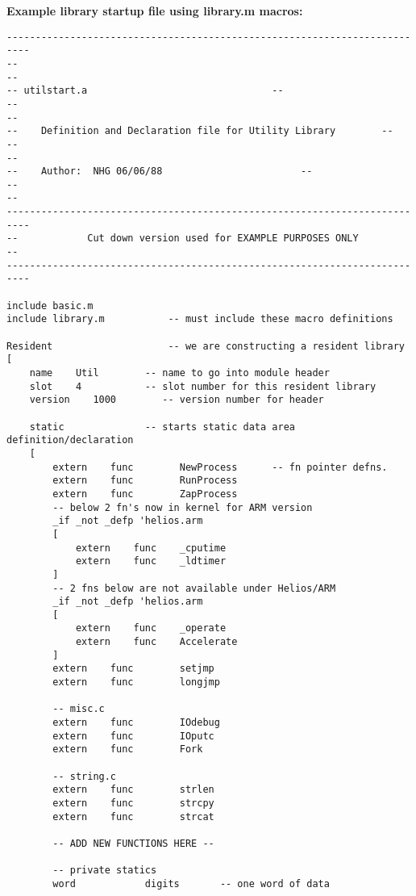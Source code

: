 {\bf Example library startup file using library.m macros:}
\vspace{0.25cm}

\scriptsize
\begin{verbatim}
--------------------------------------------------------------------------
--                                                                      --
-- utilstart.a                                --
--                                                                      --
--    Definition and Declaration file for Utility Library        --
--                                                                      --
--    Author:  NHG 06/06/88                        --
--                                                                      --
--------------------------------------------------------------------------
--            Cut down version used for EXAMPLE PURPOSES ONLY           --
--------------------------------------------------------------------------

include basic.m
include library.m           -- must include these macro definitions

Resident                    -- we are constructing a resident library
[
    name    Util        -- name to go into module header
    slot    4           -- slot number for this resident library
    version    1000        -- version number for header

    static              -- starts static data area definition/declaration
    [
        extern    func        NewProcess      -- fn pointer defns.
        extern    func        RunProcess
        extern    func        ZapProcess
        -- below 2 fn's now in kernel for ARM version
        _if _not _defp 'helios.arm
        [
            extern    func    _cputime
            extern    func    _ldtimer
        ]
        -- 2 fns below are not available under Helios/ARM
        _if _not _defp 'helios.arm
        [
            extern    func    _operate
            extern    func    Accelerate
        ]
        extern    func        setjmp
        extern    func        longjmp

        -- misc.c
        extern    func        IOdebug
        extern    func        IOputc
        extern    func        Fork

        -- string.c
        extern    func        strlen
        extern    func        strcpy
        extern    func        strcat

        -- ADD NEW FUNCTIONS HERE --

        -- private statics
        word            digits       -- one word of data


\end{verbatim}
